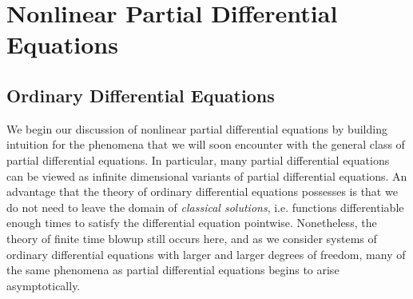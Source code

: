%
%
%
%
%
%
%
%




\part{Nonlinear Partial Differential Equations}

\chapter{Ordinary Differential Equations}

We begin our discussion of nonlinear partial differential equations by building intuition for the phenomena that we will soon encounter with the general class of partial differential equations. In particular, many partial differential equations can be viewed as infinite dimensional variants of partial differential equations. An advantage that the theory of ordinary differential equations possesses is that we do not need to leave the domain of \emph{classical solutions}, i.e. functions differentiable enough times to satisfy the differential equation pointwise. Nonetheless, the theory of finite time blowup still occurs here, and as we consider systems of ordinary differential equations with larger and larger degrees of freedom, many of the same phenomena as partial differential equations begins to arise asymptotically.

